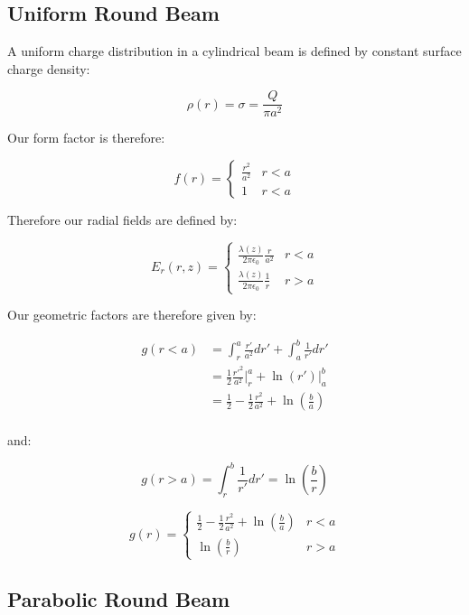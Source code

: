\subsection{Uniform Round Beam}

A uniform charge distribution in a cylindrical beam is defined by constant surface charge density:


$$\rho(r) = \sigma = \frac{Q}{\pi a^2}$$

Our form factor is therefore:

\[f(r) = \begin{cases}
        \frac{r^2}{a^2} & r < a \\
        1               & r < a
    \end{cases}\]

Therefore our radial fields are defined by:

\[E_r(r,z) = \begin{cases}
        \frac{\lambda(z)}{2\pi\epsilon_0}\frac{r}{a^2} & r < a \\
        \frac{\lambda(z)}{2\pi\epsilon_0}\frac{1}{r}   & r > a
    \end{cases}\]

Our geometric factors are therefore given by:

$$\begin{aligned}
        g(r<a) & = \int_r^a \frac{r'}{a^2}dr'+\int_a^b\frac{1}{r'}dr'                      \\
               & = \frac{1}{2}\frac{r'^2}{a^2}\Big|_r^a + \ln(r')\Big|^b_a                 \\
               & =  \frac{1}{2} - \frac{1}{2}\frac{r^2}{a^2} + \ln\left(\frac{b}{a}\right) \\
    \end{aligned}$$

and\cite{zotter_impedances_1998}:

$$g(r>a) = \int_r^b\frac{1}{r'}dr' = \ln\left(\frac{b}{r}\right)$$

\begin{equation}
    g(r) = \begin{cases}
        \frac{1}{2}-\frac{1}{2}\frac{r^2}{a^2}+\ln(\frac{b}{a}) & r < a \\
        \ln(\frac{b}{r})                                        & r > a
    \end{cases}
    \label{eq:g_uniform}
\end{equation}

\subsection{Parabolic Round Beam}

